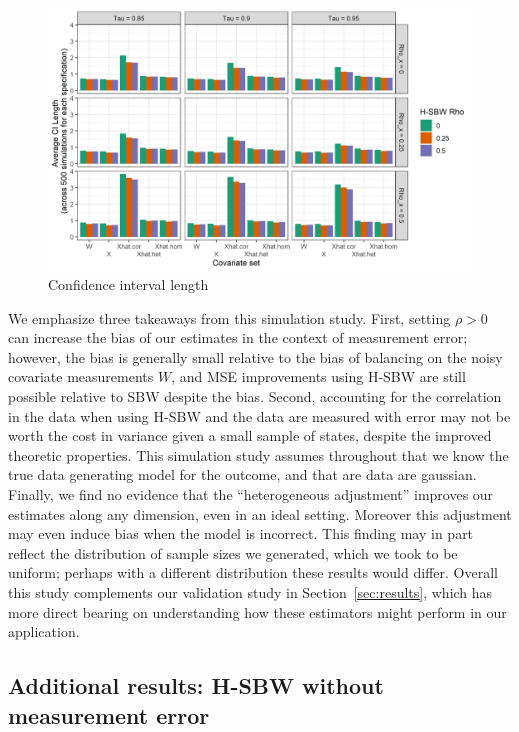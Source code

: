 \begin{figure}[H]\label{fig:ciwidth}
\begin{center}
    \caption{Confidence interval length}\label{fig:simcoverage2}
    \includegraphics[scale=0.5]{01_Plots/ci-length-plot.png}
\end{center}
\end{figure}

We emphasize three takeaways from this simulation study. First, setting $\rho > 0$ can increase the bias of our estimates in the context of measurement error; however, the bias is generally small relative to the bias of balancing on the noisy covariate measurements $W$, and MSE improvements using H-SBW are still possible relative to SBW despite the bias. Second, accounting for the correlation in the data when using H-SBW and the data are measured with error may not be worth the cost in variance given a small sample of states, despite the improved theoretic properties. This simulation study assumes throughout that we know the true data generating model for the outcome, and that are data are gaussian. Finally, we find no evidence that the ``heterogeneous adjustment'' improves our estimates along any dimension, even in an ideal setting. Moreover this adjustment may even induce bias when the model is incorrect. This finding may in part reflect the distribution of sample sizes we generated, which we took to be uniform; perhaps with a different distribution these results would differ. Overall this study complements our validation study in Section~\ref{sec:results}, which has more direct bearing on understanding how these estimators might perform in our application.

\subsection{Additional results: H-SBW without measurement error}\label{appssec:simstudyresults2}

